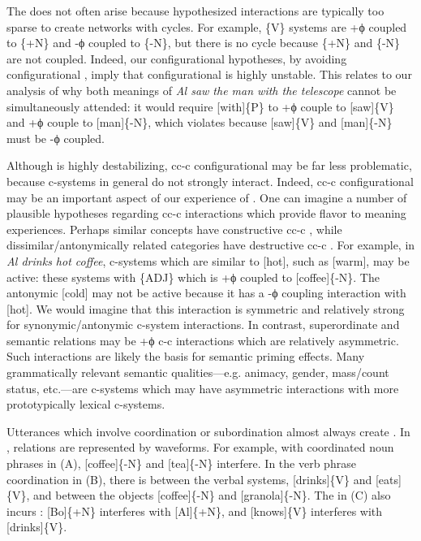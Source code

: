   The  does not often arise because hypothesized  interactions are typically too sparse to create networks with cycles. For example,  \{V\} systems are +ϕ coupled to \{+N\} and -ϕ coupled to \{-N\}, but there is no cycle because \{+N\} and \{-N\} are not coupled. Indeed, our configurational hypotheses, by avoiding configurational , imply that configurational  is highly unstable. This relates to our analysis of why both meanings of \textit{Al saw the man with the telescope} cannot be simultaneously attended: it would require [with]\{P\} to +ϕ couple to [saw]\{V\} and +ϕ couple to [man]\{-N\}, which violates  because [saw]\{V\} and [man]\{-N\} must be -ϕ coupled. 

  Although  is highly destabilizing, cc-c configurational  may be far less problematic, because c-systems in general do not strongly interact. Indeed, cc-c configurational  may be an important aspect of our experience of . One can imagine a number of plausible hypotheses regarding cc-c interactions which provide flavor to meaning experiences. Perhaps similar concepts have constructive cc-c , while dissimilar/antonymically related categories have destructive cc-c . For example, in \textit{Al drinks hot coffee}, c-systems which are similar to [hot], such as [warm], may be active: these systems  with \{\textsc{ADJ}\} which is +ϕ coupled to [coffee]\{-N\}. The antonymic [cold] may not be active because it has a -ϕ coupling interaction with [hot]. We would imagine that this interaction is symmetric and relatively strong for synonymic/antonymic c-system interactions. In contrast, superordinate and  semantic relations may be +ϕ c-c interactions which are relatively asymmetric. Such interactions are likely the basis for semantic priming effects. Many grammatically relevant semantic qualities—e.g. animacy, gender, mass/count status, etc.—are c-systems which may have asymmetric interactions with more prototypically lexical c-systems.

  Utterances which involve coordination or subordination almost always create  . In {},  relations are represented by waveforms. For example, with coordinated noun phrases in (A), [coffee]\{-N\} and [tea]\{-N\} interfere. In the verb phrase coordination in (B), there is  between the verbal systems, [drinks]\{V\} and [eats]\{V\}, and between the objects [coffee]\{-N\} and [granola]\{-N\}. The  in (C) also incurs : [Bo]\{+N\} interferes with [Al]\{+N\}, and [knows]\{V\} interferes with [drinks]\{V\}.

